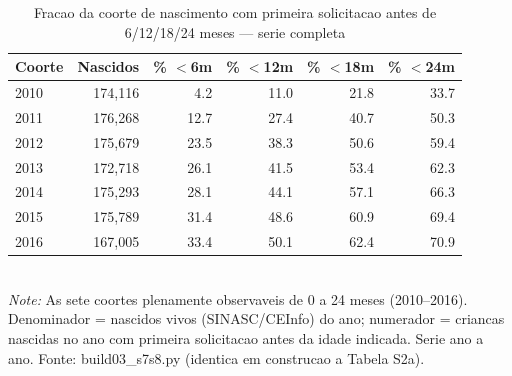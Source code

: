 \begin{table}[htbp]\centering
\caption{Fracao da coorte de nascimento com primeira solicitacao antes de 6/12/18/24 meses --- serie completa}
\label{tab:S7a}
\small
\begin{tabular}{lrrrrr}
\toprule
Coorte & Nascidos & \% $<$6m & \% $<$12m & \% $<$18m & \% $<$24m \\
\midrule
2010 & 174,116 & 4.2 & 11.0 & 21.8 & 33.7 \\
2011 & 176,268 & 12.7 & 27.4 & 40.7 & 50.3 \\
2012 & 175,679 & 23.5 & 38.3 & 50.6 & 59.4 \\
2013 & 172,718 & 26.1 & 41.5 & 53.4 & 62.3 \\
2014 & 175,293 & 28.1 & 44.1 & 57.1 & 66.3 \\
2015 & 175,789 & 31.4 & 48.6 & 60.9 & 69.4 \\
2016 & 167,005 & 33.4 & 50.1 & 62.4 & 70.9 \\
\bottomrule
\end{tabular}
\\[3pt]{\footnotesize \textit{Note:} As sete coortes plenamente observaveis de 0 a 24 meses (2010--2016). Denominador = nascidos vivos (SINASC/CEInfo) do ano; numerador = criancas nascidas no ano com primeira solicitacao antes da idade indicada. Serie ano a ano. Fonte: build03\_s7s8.py (identica em construcao a Tabela S2a).}
\end{table}
